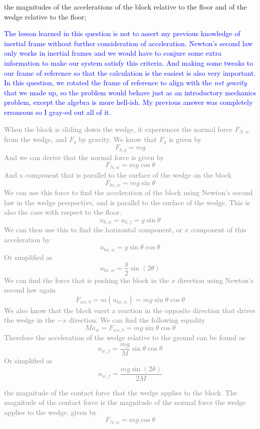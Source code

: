\documentclass[12pt]{article}
\newcommand{\paren}[1]{\left( #1 \right)}
\begin{document}
\begin{enumerate}
    \item the magnitudes of the accelerations of the block relative to the floor and of the wedge relative to the floor;

\textcolor{blue}{The lesson learned in this question is not to assert my previous knowledge of inertial frame without further consideration of acceleration. Newton's second law only works in inertial frames and we would have to conjure some extra information to make our system satisfy this criteria. And making some tweaks to our frame of reference so that the calculation is the easiest is also very important. In this question, we rotated the frame of reference to align with the \textit{net gravity} that we made up, so the problem would behave just as an introductory mechanics problem, except the algebra is more hell-ish. My previous answer was completely erroneous so I gray-ed out all of it.}

\textcolor{gray}{When the block is sliding down the wedge, it experiences the normal force $F_{N,w}$ from the wedge, and $F_g$ by gravity. We know that $F_g$ is given by
    \[
    F_{b,g} = mg
    \]
    And we can derive that the normal force is given by
    \[
    F_{N,w} = mg\cos\theta
    \]
    And a component that is parallel to the surface of the wedge on the block
    \[
    F_{bx,w} = mg\sin\theta
    \]
    We can use this force to find the acceleration of the block using Newton's second law in the wedge perspective, and is parallel to the surface of the wedge. This is also the case with respect to the floor. 
    \[
    a_{b,w} = a_{b,f} = g\sin\theta
    \]
    We can then use this to find the horizontal component, or $x$ component of this acceleration by
    \[
    a_{bx,w}=g\sin\theta\cos\theta
    \]
    Or simplified as
    \[
    a_{bx,w} = \frac{g}{2}\sin\paren{2\theta}
    \]
    We can find the force that is pushing the block in the $x$ direction using Newton's second law again
    \[
    F_{wx,b} = m\paren{a_{bx,w}} = mg\sin\theta\cos\theta
    \]
    We also know that the block exert a reaction in the opposite direction that drives the wedge in the $-x$ direction. We can find the following equality
    \[
    Ma_w = F_{wx,b} = mg\sin\theta\cos\theta
    \]
    Therefore the acceleration of the wedge relative to the ground can be found as
    \[
    a_{w,f} = \frac{mg}{M}\sin\theta\cos\theta
    \]
    Or simplified as
    \[
    a_{w,f} = \frac{mg\sin\paren{2\theta}}{2M}
    \]
    \item the magnitude of the contact force that the wedge applies to the block. The magnitude of the contact force is the magnitude of the normal force the wedge applies to the wedge, given by 
    \[
    F_{N,w} = mg\cos\theta
    \]}


\end{enumerate}
\end{document}
